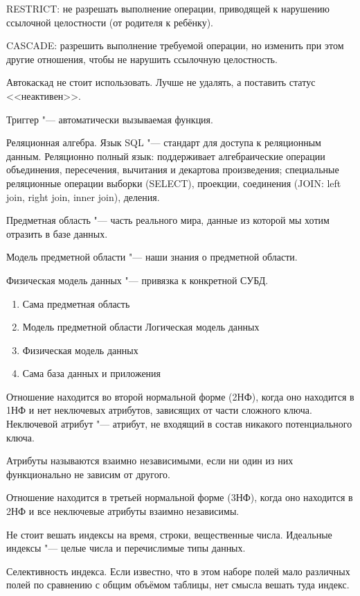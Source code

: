 \documentclass[12pt]{article}
\begin{document}
RESTRICT: не разрешать выполнение операции, приводящей к нарушению ссылочной целостности (от родителя к ребёнку).

CASCADE: разрешить выполнение требуемой операции, но изменить при этом другие отношения, чтобы не нарушить ссылочную целостность.

Автокаскад не стоит использовать. Лучше не удалять, а поставить статус <<неактивен>>.

Триггер "--- автоматически вызываемая функция.

Реляционная алгебра. Язык SQL "--- стандарт для доступа к реляционным данным. Реляционно полный язык: поддерживает алгебраические операции объединения, пересечения, вычитания и декартова произведения; специальные реляционные операции выборки (SELECT), проекции, соединения (JOIN: left join, right join, inner join), деления.

Предметная область "--- часть реального мира, данные из которой мы хотим отразить в базе данных.

Модель предметной области "--- наши знания о предметной области.

Физическая модель данных "--- привязка к конкретной СУБД.

\begin{enumerate}
\item Сама предметная область
\item Модель предметной области
\itrm Логическая модель данных
\item Физическая модель данных
\item Сама база данных и приложения
\end{enumerate}

Отношение находится во второй нормальной форме (2НФ), когда оно находится в 1НФ и нет неключевых атрибутов, зависящих от части сложного ключа. Неключевой атрибут "---  атрибут, не входящий в состав никакого потенциального ключа.

Атрибуты называются взаимно независимыми, если ни один из них функционально не зависим от другого.

Отношение находится в третьей нормальной форме (3НФ), когда оно находится в 2НФ и все неключевые атрибуты взаимно независимы.

Не стоит вешать индексы на время, строки, вещественные числа. Идеальные индексы "--- целые числа и перечислимые типы данных.

Селективность индекса. Если известно, что в этом наборе полей мало различных полей по сравнению с общим объёмом таблицы, нет смысла вешать туда индекс.
\end{document}
